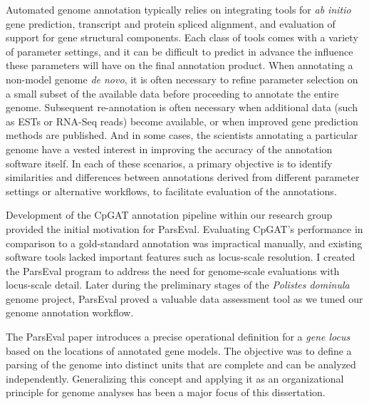 Automated genome annotation typically relies on integrating tools for \textit{ab initio} gene prediction, transcript and protein spliced alignment, and evaluation of support for gene structural components.
Each class of tools comes with a variety of parameter settings, and it can be difficult to predict in advance the influence these parameters will have on the final annotation product.
When annotating a non-model genome \textit{de novo}, it is often necessary to refine parameter selection on a small subset of the available data before proceeding to annotate the entire genome.
Subsequent re-annotation is often necessary when additional data (such as ESTs or RNA-Seq reads) become available, or when improved gene prediction methods are published.
And in some cases, the scientists annotating a particular genome have a vested interest in improving the accuracy of the annotation software itself.
In each of these scenarios, a primary objective is to identify similarities and differences between annotations derived from different parameter settings or alternative workflows, to facilitate evaluation of the annotations.

Development of the CpGAT annotation pipeline within our research group provided the initial motivation for ParsEval.
Evaluating CpGAT's performance in comparison to a gold-standard annotation was impractical manually, and existing software tools \cite{Keibler,Wang} lacked important features such as locus-scale resolution.
I created the ParsEval program to address the need for genome-scale evaluations with locus-scale detail.
Later during the preliminary stages of the \textit{Polistes dominula} genome project, ParsEval proved a valuable data assessment tool as we tuned our genome annotation workflow.

The ParsEval paper introduces a precise operational definition for a \textit{gene locus} based on the locations of annotated gene models.
The objective was to define a parsing of the genome into distinct units that are complete and can be analyzed independently.
Generalizing this concept and applying it as an organizational principle for genome analyses has been a major focus of this dissertation.

